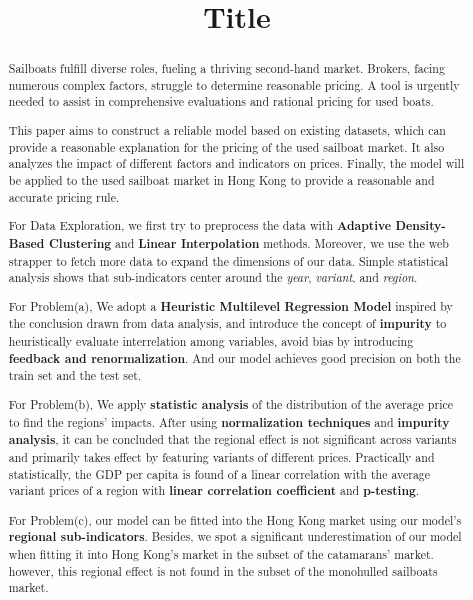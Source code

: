 \documentclass[12pt]{article}  %
\title{Title}  %
\begin{document}
\begin{abstract}
    Sailboats fulfill diverse roles, fueling a thriving second-hand market. 
    Brokers, facing numerous complex factors, struggle to determine reasonable pricing. 
    A tool is urgently needed to assist in comprehensive evaluations and rational pricing for used boats.

    This paper aims to construct a reliable model based on existing datasets, 
    which can provide a reasonable explanation for the pricing of the used sailboat market. 
    It also analyzes the impact of different factors and indicators on prices. 
    Finally, the model will be applied to the used sailboat market in Hong Kong to provide a reasonable and accurate pricing rule.

    For Data Exploration, we first try to preprocess the data with \textbf{Adaptive Density-Based Clustering} and \textbf{Linear Interpolation} methods.
    Moreover, we use the web strapper to fetch more data to expand the dimensions of our data. Simple statistical analysis shows that sub-indicators center around the \emph{year}, \emph{variant}, and \emph{region}.
    
    For Problem(a), We adopt a \textbf{Heuristic Multilevel Regression Model} inspired by the conclusion drawn from data analysis, and introduce the concept of \textbf{impurity} to heuristically evaluate interrelation among variables, avoid bias by introducing \textbf{feedback and renormalization}.
    And our model achieves good precision on both the train set and the test set.

    For Problem(b), 
    We apply \textbf{statistic analysis} of the distribution of the average price to find the regions' impacts.
    After using \textbf{normalization techniques} and \textbf{impurity analysis}, it can be concluded that the regional effect is not significant across variants and primarily takes effect by featuring variants of different prices.
    Practically and statistically, the GDP per capita is found of a linear correlation with the average variant prices of a region with \textbf{linear correlation coefficient} and \textbf{p-testing}.

    For Problem(c),
    our model can be fitted into the Hong Kong market using our model's \textbf{regional sub-indicators}.
    Besides, we spot a significant underestimation of our model when fitting it into Hong Kong's market in the subset of the catamarans' market.
    however, this regional effect is not found in the subset of the monohulled sailboats market. 
    

\end{abstract}
\end{document}
